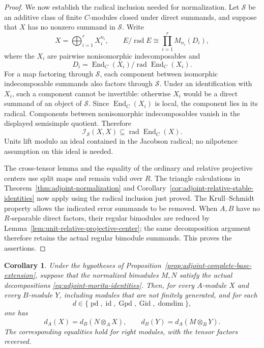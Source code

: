 \documentclass[12pt,a4paper,english,reqno]{amsart}
\numberwithin{equation}{section}
\theoremstyle{plain}
\newtheorem{corollary}[theorem]{Corollary}
\theoremstyle{definition}
\begin{document}
\begin{proof}
We now establish the radical inclusion needed for normalization.
Let $\mathcal S$ be an additive class of finite $C$-modules closed
under direct summands, and suppose that $X$ has no nonzero summand in
$\mathcal S$.  Write
\[
 X=\bigoplus_{i=1}^r X_i^{n_i},
 \qquad
 E/\operatorname{rad}E\cong\prod_{i=1}^r M_{n_i}(D_i),
\]
where the $X_i$ are pairwise nonisomorphic indecomposables and
\[
 D_i=\operatorname{End}_C(X_i)/
       \operatorname{rad}\operatorname{End}_C(X_i).
\]
For a map factoring through $\mathcal S$, each component between
isomorphic indecomposable summands also factors through
$\mathcal S$.  Under an identification with $X_i$, such a component
cannot be invertible: otherwise $X_i$ would be a direct summand of
an object of $\mathcal S$.  Since $\operatorname{End}_C(X_i)$ is
local, the component lies in its radical.  Components between
nonisomorphic indecomposables vanish in the displayed semisimple
quotient.  Therefore
\[
 \mathcal I_{\mathcal S}(X,X)
 \subseteq\operatorname{rad}\operatorname{End}_C(X).
\]
Units lift modulo an ideal contained in the Jacobson radical; no
nilpotence assumption on this ideal is needed.

The cross-tensor lemma and the equality of the ordinary and relative
projective centers use split maps and remain valid over $R$.
The triangle calculations in Theorem~\ref{thm:adjoint-normalization}
and Corollary~\ref{cor:adjoint-relative-stable-identities} now apply
using the radical inclusion just proved.  The Krull--Schmidt property
allows the indicated error summands to be removed.  When $A,B$ have
no $R$-separable direct factors, their regular bimodules are reduced
by Lemma~\ref{lem:unit-relative-projective-center}; the same
decomposition argument therefore retains the actual regular
bimodule summands.  This proves the assertions.
\end{proof}

\begin{corollary}
\label{cor:complete-base-individual-dimensions}
Under the hypotheses of Proposition~\ref{prop:adjoint-complete-base-extension},
suppose that the normalized bimodules $M,N$ satisfy the actual
decompositions \eqref{eq:adjoint-morita-identities}.  Then, for every
$A$-module $X$ and every $B$-module $Y$, including modules that are
not finitely generated, and for each
\[
 d\in\{\operatorname{pd},\operatorname{id},
       \operatorname{Gpd},\operatorname{Gid},\operatorname{domdim}\},
\]
one has
\[
 d_A(X)=d_B(N\otimes_AX),
 \qquad d_B(Y)=d_A(M\otimes_BY).
\]
The corresponding equalities hold for right modules, with the tensor
factors reversed.
\end{corollary}
\end{document}
